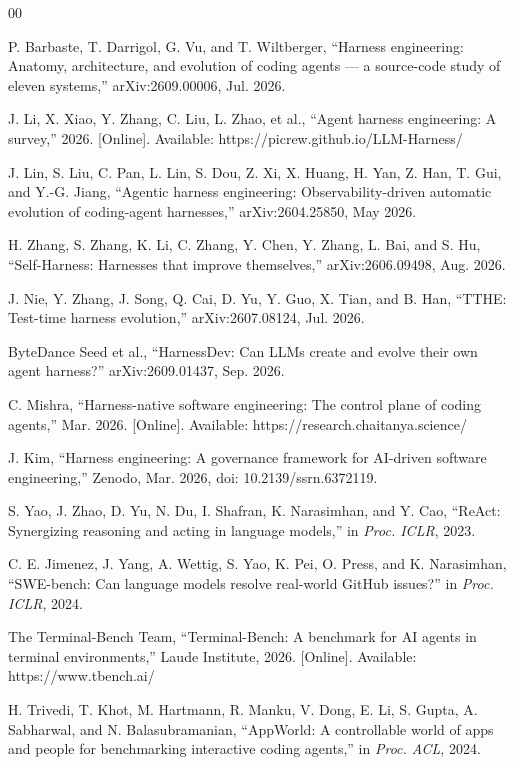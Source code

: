 \documentclass[conference]{IEEEtran}
\begin{document}
\begin{thebibliography}{00}

 P. Barbaste, T. Darrigol, G. Vu, and T. Wiltberger, ``Harness engineering: Anatomy, architecture, and evolution of coding agents --- a source-code study of eleven systems,'' arXiv:2609.00006, Jul. 2026.

 J. Li, X. Xiao, Y. Zhang, C. Liu, L. Zhao, et al., ``Agent harness engineering: A survey,'' 2026. [Online]. Available: https://picrew.github.io/LLM-Harness/

 J. Lin, S. Liu, C. Pan, L. Lin, S. Dou, Z. Xi, X. Huang, H. Yan, Z. Han, T. Gui, and Y.-G. Jiang, ``Agentic harness engineering: Observability-driven automatic evolution of coding-agent harnesses,'' arXiv:2604.25850, May 2026.

 H. Zhang, S. Zhang, K. Li, C. Zhang, Y. Chen, Y. Zhang, L. Bai, and S. Hu, ``Self-Harness: Harnesses that improve themselves,'' arXiv:2606.09498, Aug. 2026.

 J. Nie, Y. Zhang, J. Song, Q. Cai, D. Yu, Y. Guo, X. Tian, and B. Han, ``TTHE: Test-time harness evolution,'' arXiv:2607.08124, Jul. 2026.

 ByteDance Seed et al., ``HarnessDev: Can LLMs create and evolve their own agent harness?'' arXiv:2609.01437, Sep. 2026.

 C. Mishra, ``Harness-native software engineering: The control plane of coding agents,'' Mar. 2026. [Online]. Available: https://research.chaitanya.science/

 J. Kim, ``Harness engineering: A governance framework for AI-driven software engineering,'' Zenodo, Mar. 2026, doi: 10.2139/ssrn.6372119.

 S. Yao, J. Zhao, D. Yu, N. Du, I. Shafran, K. Narasimhan, and Y. Cao, ``ReAct: Synergizing reasoning and acting in language models,'' in \emph{Proc. ICLR}, 2023.

 C. E. Jimenez, J. Yang, A. Wettig, S. Yao, K. Pei, O. Press, and K. Narasimhan, ``SWE-bench: Can language models resolve real-world GitHub issues?'' in \emph{Proc. ICLR}, 2024.

 The Terminal-Bench Team, ``Terminal-Bench: A benchmark for AI agents in terminal environments,'' Laude Institute, 2026. [Online]. Available: https://www.tbench.ai/

 H. Trivedi, T. Khot, M. Hartmann, R. Manku, V. Dong, E. Li, S. Gupta, A. Sabharwal, and N. Balasubramanian, ``AppWorld: A controllable world of apps and people for benchmarking interactive coding agents,'' in \emph{Proc. ACL}, 2024.


\end{thebibliography}
\end{document}

